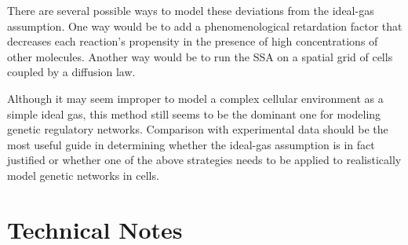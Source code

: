 \documentclass[english,letterpaper,12pt]{report}
\begin{document}
\begin{doublespacing}
There are several possible ways to model these deviations from the ideal-gas assumption. One way would be to add a phenomenological retardation factor that decreases each reaction's propensity in the presence of high concentrations of other molecules. Another way would be to run the SSA on a spatial grid of cells coupled by a diffusion law.

Although it may seem improper to model a complex cellular environment as a simple ideal gas, this method still seems to be the dominant one for modeling genetic regulatory networks. Comparison with experimental data should be the most useful guide in determining whether the ideal-gas assumption is in fact justified or whether one of the above strategies needs to be applied to realistically model genetic networks in cells.




\appendix

\chapter{Technical Notes} %
\label{sec:tech-notes}


\end{doublespacing}



\end{document}
